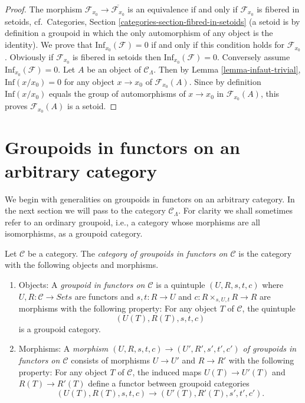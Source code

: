 \begin{proof}
The morphism $\mathcal{F}_{x_0} \to \overline{\mathcal{F}_{x_0}}$ is an
equivalence if and only if $\mathcal{F}_{x_0}$ is fibered in setoids,
cf.\ Categories, Section \ref{categories-section-fibred-in-setoids}
(a setoid is by definition a groupoid in
which the only automorphism of any object is the identity). We prove that
$\text{Inf}_{x_0}(\mathcal{F}) = 0$ if and only if this condition holds
for $\mathcal{F}_{x_0}$.  Obviously if $\mathcal{F}_{x_0}$ is fibered in
setoids then $\text{Inf}_{x_0}(\mathcal{F}) = 0$.  Conversely assume
$\text{Inf}_{x_0}(\mathcal{F}) = 0$.  Let $A$ be an object of
$\mathcal{C}_\Lambda$. Then by
Lemma \ref{lemma-infaut-trivial},
$\text{Inf}(x/x_0) = 0$ for any object $x \to x_0$ of
$\mathcal{F}_{x_0}(A)$. Since by definition $\text{Inf}(x/x_0)$
equals the group of automorphisms of $x \to x_0$ in $\mathcal{F}_{x_0}(A)$,
this proves $\mathcal{F}_{x_0}(A)$ is a setoid.
\end{proof}






\section{Groupoids in functors on an arbitrary category}
\label{section-groupoids-arbitrary}

\noindent
We begin with generalities on groupoids in functors on an
arbitrary category. In the next section we will
pass to the category $\mathcal{C}_\Lambda$.
For clarity we shall sometimes refer to an ordinary groupoid,
i.e., a category whose morphisms are all isomorphisms, as a groupoid category.

\begin{definition}
\label{definition-groupoid-in-functors}
Let $\mathcal{C}$ be a category. The
{\it category of groupoids in functors on $\mathcal{C}$}
is the category with the following objects and morphisms.
\begin{enumerate}
\item Objects: A {\it groupoid in functors on $\mathcal{C}$} is a quintuple
$(U, R, s, t, c)$ where $U, R : \mathcal{C} \to \textit{Sets}$ are
functors and $s, t : R \to U$ and $c : R \times_{s, U, t} R \to R$
are morphisms with the following property: For any object $T$ of $\mathcal{C}$,
the quintuple
$$
(U(T), R(T), s, t, c)
$$
is a groupoid category.
\item Morphisms: A {\it morphism $(U, R, s, t, c) \to (U', R', s', t', c')$ of
groupoids in functors on $\mathcal{C}$} consists of morphisms $U \to U'$
and $R \to R'$ with the following property: For any object $T$ of
$\mathcal{C}$, the induced maps $U(T) \to U'(T)$ and
$R(T) \to R'(T)$ define a functor between groupoid categories
$$
(U(T), R(T), s, t, c) \to (U'(T), R'(T), s', t', c').
$$
\end{enumerate}
\end{definition}

